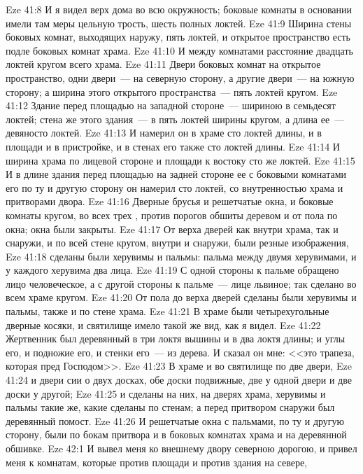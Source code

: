 \vs Eze 41:8 И я видел верх дома во всю окружность; боковые комнаты в основании имели там меры цельную трость, шесть полных локтей.
\vs Eze 41:9 Ширина стены боковых комнат, выходящих наружу, пять локтей, и открытое пространство есть подле боковых комнат храма.
\vs Eze 41:10 И между комнатами расстояние двадцать локтей кругом всего храма.
\vs Eze 41:11 Двери боковых комнат  на открытое пространство, одни двери~--- на северную сторону, а другие двери~--- на южную сторону; а ширина этого открытого пространства~--- пять локтей кругом.
\vs Eze 41:12 Здание перед площадью на западной стороне~--- шириною в семьдесят локтей; стена же этого здания~--- в пять локтей ширины кругом, а длина ее~--- девяносто локтей.
\vs Eze 41:13 И намерил он в храме сто локтей длины, и в площади и в пристройке, и в стенах его также сто локтей длины.
\vs Eze 41:14 И ширина храма по лицевой стороне и площади к востоку сто же локтей.
\vs Eze 41:15 И в длине здания перед площадью на задней стороне ее с боковыми комнатами его по ту и другую сторону он намерил сто локтей, со внутренностью храма и притворами двора.
\vs Eze 41:16 Дверные брусья и решетчатые окна, и боковые комнаты кругом, во всех трех , против порогов обшиты деревом и от пола по окна; окна были закрыты.
\vs Eze 41:17 От верха дверей как внутри храма, так и снаружи, и по всей стене кругом, внутри и снаружи, были резные изображения,
\vs Eze 41:18 сделаны были херувимы и пальмы: пальма между двумя херувимами, и у каждого херувима два лица.
\vs Eze 41:19 С одной стороны к пальме обращено лицо человеческое, а с другой стороны к пальме~--- лице львиное; так сделано во всем храме кругом.
\vs Eze 41:20 От пола до верха дверей сделаны были херувимы и пальмы, также и по стене храма.
\vs Eze 41:21 В храме были четырехугольные дверные косяки, и святилище имело такой же вид, как я видел.
\vs Eze 41:22 Жертвенник был деревянный в три локтя вышины и в два локтя длины; и углы его, и подножие его, и стенки его~--- из дерева. И сказал он мне: <<это трапеза, которая пред Господом>>.
\vs Eze 41:23 В храме и во святилище по две двери,
\vs Eze 41:24 и двери сии о двух досках, обе доски подвижные, две у одной двери и две доски у другой;
\vs Eze 41:25 и сделаны на них, на дверях храма, херувимы и пальмы такие же, какие сделаны по стенам; а перед притвором снаружи был деревянный помост.
\vs Eze 41:26 И решетчатые окна с пальмами, по ту и другую сторону, были по бокам притвора и в боковых комнатах храма и на деревянной обшивке.
\vs Eze 42:1 И вывел меня ко внешнему двору северною дорогою, и привел меня к комнатам, которые против площади и против здания на севере,
